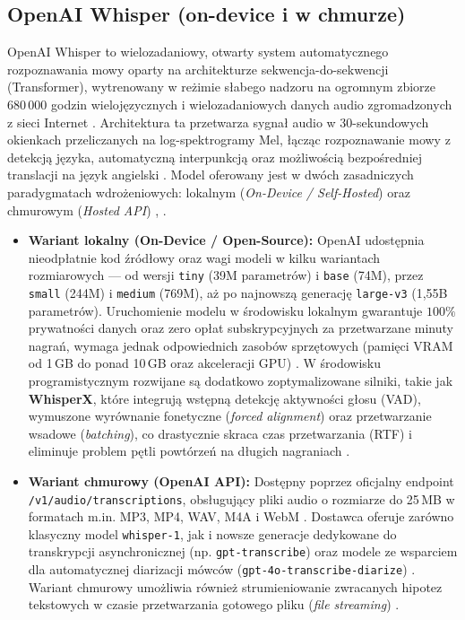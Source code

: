 \subsection{OpenAI Whisper (on-device i w chmurze)}
OpenAI Whisper to wielozadaniowy, otwarty system automatycznego rozpoznawania mowy oparty na architekturze sekwencja-do-sekwencji (Transformer), wytrenowany w reżimie słabego nadzoru na ogromnym zbiorze 680\,000 godzin wielojęzycznych i wielozadaniowych danych audio zgromadzonych z sieci Internet \cite[s.~1, 1--4]{radford2023robust}. Architektura ta przetwarza sygnał audio w 30-sekundowych okienkach przeliczanych na log-spektrogramy Mel, łącząc rozpoznawanie mowy z detekcją języka, automatyczną interpunkcją oraz możliwością bezpośredniej translacji na język angielski \cite[s.~3--5]{radford2023robust}. Model oferowany jest w dwóch zasadniczych paradygmatach wdrożeniowych: lokalnym (\textit{On-Device / Self-Hosted}) oraz chmurowym (\textit{Hosted API}) \cite{openai_file_transcription}, \cite[s.~18]{pudo2024optimizing}.
\begin{itemize}
\item \textbf{Wariant lokalny (On-Device / Open-Source):} OpenAI udostępnia nieodpłatnie kod źródłowy oraz wagi modeli w kilku wariantach rozmiarowych — od wersji \texttt{tiny} (39M parametrów) i \texttt{base} (74M), przez \texttt{small} (244M) i \texttt{medium} (769M), aż po najnowszą generację \texttt{large-v3} (1{,}55B parametrów). Uruchomienie modelu w środowisku lokalnym gwarantuje $100\%$ prywatności danych oraz zero opłat subskrypcyjnych za przetwarzane minuty nagrań, wymaga jednak odpowiednich zasobów sprzętowych (pamięci VRAM od 1\,GB do ponad 10\,GB oraz akceleracji GPU) \cite{openai_whisper_repo}. W środowisku programistycznym rozwijane są dodatkowo zoptymalizowane silniki, takie jak \textbf{WhisperX}, które integrują wstępną detekcję aktywności głosu (VAD), wymuszone wyrównanie fonetyczne (\textit{forced alignment}) oraz przetwarzanie wsadowe (\textit{batching}), co drastycznie skraca czas przetwarzania (RTF) i eliminuje problem pętli powtórzeń na długich nagraniach \cite[s.~2]{ferraro2023benchmarking}.
\item \textbf{Wariant chmurowy (OpenAI API):} Dostępny poprzez oficjalny endpoint \texttt{/v1/audio/\allowbreak transcriptions}, obsługujący pliki audio o rozmiarze do 25\,MB w formatach m.in. MP3, MP4, WAV, M4A i WebM \cite{openai_file_transcription}. Dostawca oferuje zarówno klasyczny model \texttt{whisper-1}, jak i nowsze generacje dedykowane do transkrypcji asynchronicznej (np. \texttt{gpt-transcribe}) oraz modele ze wsparciem dla automatycznej diarizacji mówców (\texttt{gpt-4o-transcribe-diarize}) \cite{openai_file_transcription}. Wariant chmurowy umożliwia również strumieniowanie zwracanych hipotez tekstowych w czasie przetwarzania gotowego pliku (\textit{file streaming}) \cite{openai_file_transcription}.
\end{itemize}
